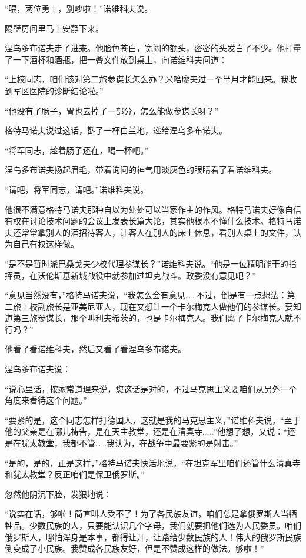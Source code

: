 “喂，两位勇士，别吵啦！”诺维科夫说。

隔壁房间里马上安静下来。

涅乌多布诺夫走了进来。他脸色苍白，宽阔的额头，密密的头发白了不少。他打量了一下酒杯和酒瓶，把一叠文件放到桌上，向诺维科夫问道：

“上校同志，咱们该对第二旅参谋长怎么办？米哈廖夫过一个半月才能回来。我收到军区医院的诊断结论啦。”

“他没有了肠子，胃也去掉了一部分，怎么能做参谋长呀？”

格特马诺夫说过这话，斟了一杯白兰地，递给涅乌多布诺夫。

“将军同志，趁着肠子还在，喝一杯吧。”

涅乌多布诺夫扬起眉毛，带着询问的神气用淡灰色的眼睛看了看诺维科夫。

“请吧，将军同志，请吧。”诺维科夫说。

他很不满意格特马诺夫那种自以为处处可以当家作主的作风。格特马诺夫好像自信有权在讨论技术问题的会议上发表长篇大论，其实他根本不懂什么技术。格特马诺夫还常常拿别人的酒招待客人，让客人在别人的床上休息，看别人桌上的文件，认为自己有权这样做。

“是不是暂时派巴桑戈夫少校代理参谋长？”诺维科夫说。“他是一位精明能干的指挥员，在沃伦斯基新城战役中就参加过坦克战斗。政委没有意见吧？”

“意见当然没有，”格特马诺夫说，“我怎么会有意见……不过，倒是有一点想法：第二旅上校副旅长是亚美尼亚人，现在又想让一个卡尔梅克人做他们的参谋长。要知道第三旅参谋长，那个叫利夫希茨的，也是卡尔梅克人。我们离了卡尔梅克人就不行吗？”

他看了看诺维科夫，然后又看了看涅乌多布诺夫。

涅乌多布诺夫说：

“说心里话，按家常道理来说，您这话是对的，不过马克思主义要咱们从另外一个角度来看待这个问题。”

“要紧的是，这个同志怎样打德国人，这就是我的马克思主义，”诺维科夫说，“至于他的父亲是在哪儿祷告，是在天主教堂，还是在清真寺……”他想了想，又说：“还是在犹太教堂，我都不管……我认为，在战争中最要紧的是射击。”

“是的，是的，正是这样，”格特马诺夫快活地说，“在坦克军里咱们还管什么清真寺和犹太教堂？反正咱们是保卫俄罗斯。”

忽然他阴沉下脸，发狠地说：

“说实在话，够啦！简直叫人受不了！为了各民族友谊，咱们总是拿俄罗斯人当牺牲品。少数民族的人，只要能认识几个字母，我们就要把他们选为人民委员。咱们俄罗斯人，哪怕浑身是本事，都得让开，让路给少数民族的人！伟大的俄罗斯民族倒变成了小民族。我赞成各民族友好，但是不赞成这样的做法。够啦！”

